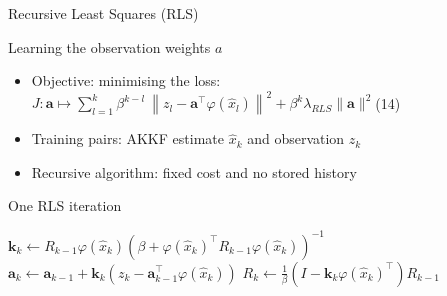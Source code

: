 \documentclass[9pt]{beamer}
\begin{document}
\begin{frame}{Recursive Least Squares (RLS)}

\begin{block}{Learning the observation weights $a$}
    \begin{itemize}
    \item Objective: minimising the loss:\\
    \hfill$\displaystyle J:\mathbf{a}\mapsto\sum_{l=1}^k\beta^{k-l}\:\left\|z_l-\mathbf{a}^\top\varphi(\hat{x}_l)\right\|^2+\beta^k\lambda_{RLS}\|\mathbf{a}\|^2$\hfill(14)
    \item Training pairs: AKKF estimate $\hat{x}_k$ and observation $z_k$
    \item[$\Rightarrow$]Recursive algorithm: fixed cost and no stored history
    \end{itemize}
\end{block}

\begin{block}{One RLS iteration}
\begin{algorithmic}
    \State$\mathbf{k}_k\gets R_{k-1}\varphi(\hat{x}_k)\left(\beta+\varphi(\hat{x}_k)^\top R_{k-1}\varphi(\hat{x}_k)\right)^{-1}$ 
    \State$\mathbf{a}_k\gets\mathbf{a}_{k-1}+\mathbf{k}_k\left(z_k-\mathbf{a}_{k-1}^\top\varphi(\hat{x}_k)\right)$
    \State$R_k\gets\frac{1}{\beta}\left(I-\mathbf{k}_k\varphi(\hat{x}_k)^\top\right)R_{k-1}$
\end{algorithmic}
\end{block}

\end{frame}
\end{document}
